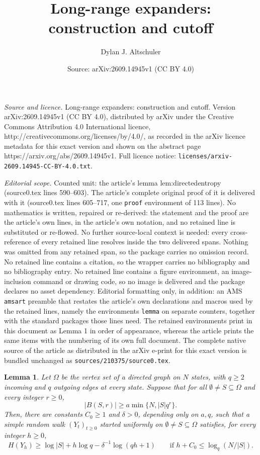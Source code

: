 \documentclass[10pt,a4paper]{amsart}
\title{Long-range expanders: construction and cutoff}
\author{Dylan J. Altschuler}
\date{Source: arXiv:2609.14945v1 (CC BY 4.0)}
\newtheorem{lemma}{Lemma}
\begin{document}
\maketitle

\noindent\emph{Source and licence.} Long-range expanders: construction and cutoff. Version arXiv:2609.14945v1 (CC BY 4.0), distributed by arXiv under the Creative Commons Attribution 4.0 International licence, http://creativecommons.org/licenses/by/4.0/, as recorded in the arXiv licence metadata for this exact version and shown on the abstract page https://arxiv.org/abs/2609.14945v1. Full licence notice: \texttt{licenses/arxiv-2609.14945-CC-BY-4.0.txt}.\par\smallskip

\noindent\textit{Editorial scope.} Counted unit: the article's lemma lem:directedentropy (source0.tex lines 590--603). The article's complete original proof of it is delivered with it (source0.tex lines 605--717, one \texttt{proof} environment of 113 lines). No mathematics is written, repaired or re-derived: the statement and the proof are the article's own lines, in the article's own notation, and no retained line is substituted or re-flowed.  No further source-local context is needed: every cross-reference of every retained line resolves inside the two delivered spans.  Nothing was omitted from any retained span, so the package carries no omission record.  No retained line contains a citation, so the wrapper carries no bibliography and no bibliography entry.  No retained line contains a figure environment, an image-inclusion command or drawing code, so no image is delivered and the package declares no asset dependency.  Editorial formatting only, in addition: an AMS \texttt{amsart} preamble that restates the article's own declarations and macros used by the retained lines, namely the environments \texttt{lemma} on separate counters, together with the standard packages those lines need.  The retained environments print in this document as Lemma 1 in order of appearance, whereas the article prints the same items with the numbering of its own full document.  The complete native source of the article as distributed in the arXiv e-print for this exact version is bundled unchanged as \texttt{sources/210375/source0.tex}.
\begin{lemma}\label{lem:directedentropy}
Let $\Omega$ be the vertex set of a directed graph on $N$ states,
with $q\ge2$ incoming and $q$ outgoing edges at every state. Suppose that for all $\emptyset \neq S \subseteq \Omega$ and every integer $r\ge0$,
\[
 |B(S,r)|\ge a\min\{N,|S|q^r\}.
\]
Then, there are constants $C_0\ge1$ and $\delta>0$, depending only on
$a,q$, such that a simple random walk $(Y_t)_{t\ge0}$ started uniformly on
$\emptyset \neq S \subseteq \Omega$ satisfies, for every integer $h\ge0$,
\begin{equation}\label{eq:entropybound}
 H(Y_h)\ge\log|S|+h\log q-\delta^{-1}\log(qh+1)
 \qquad\text{if }h+C_0\le\log_q(N/|S|).
\end{equation}
\end{lemma}
\end{document}
